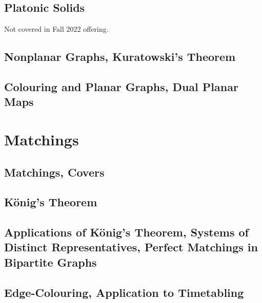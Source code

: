 \documentclass[class=math239,notes,tikz]{agony}
\begin{document}
\subsection{Platonic Solids}

Not covered in Fall 2022 offering.

\setcounter{subsection}{5}
\subsection{Nonplanar Graphs, Kuratowski's Theorem}

\setcounter{subsection}{7}
\subsection{Colouring and Planar Graphs, Dual Planar Maps}

\section{Matchings}

\setcounter{subsection}{1}
\subsection{Matchings, Covers}

\subsection{K\"onig's Theorem}

\setcounter{subsection}{5}
\subsection{Applications of K\"onig's Theorem, Systems of Distinct Representatives, Perfect Matchings in Bipartite Graphs}

\setcounter{subsection}{7}
\subsection{Edge-Colouring, Application to Timetabling}
\end{document}
